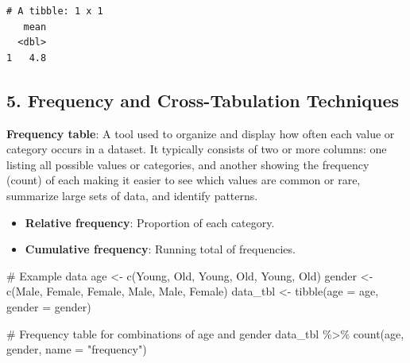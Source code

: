 \documentclass[
  man,
  floatsintext,
  longtable,
  nolmodern,
  notxfonts,
  notimes,
  colorlinks=true,linkcolor=blue,citecolor=blue,urlcolor=blue]{apa7}
\newenvironment{Shaded}{\begin{snugshade}}{\end{snugshade}}
\newcommand{\AttributeTok}[1]{\textcolor[rgb]{0.40,0.45,0.13}{#1}}
\newcommand{\CommentTok}[1]{\textcolor[rgb]{0.37,0.37,0.37}{#1}}
\newcommand{\FunctionTok}[1]{\textcolor[rgb]{0.28,0.35,0.67}{#1}}
\newcommand{\NormalTok}[1]{\textcolor[rgb]{0.00,0.23,0.31}{#1}}
\newcommand{\OtherTok}[1]{\textcolor[rgb]{0.00,0.23,0.31}{#1}}
\newcommand{\SpecialCharTok}[1]{\textcolor[rgb]{0.37,0.37,0.37}{#1}}
\newcommand{\StringTok}[1]{\textcolor[rgb]{0.13,0.47,0.30}{#1}}
\providecommand{\tightlist}{%
  \setlength{\itemsep}{0pt}\setlength{\parskip}{0pt}}
\begin{document}
\begin{verbatim}
# A tibble: 1 x 1
   mean
  <dbl>
1   4.8
\end{verbatim}

\subsection{5. Frequency and Cross-Tabulation
Techniques}\label{frequency-and-cross-tabulation-techniques}

\textbf{Frequency table}: A tool used to organize and display how often
each value or category occurs in a dataset. It typically consists of two
or more columns: one listing all possible values or categories, and
another showing the frequency (count) of each making it easier to see
which values are common or rare, summarize large sets of data, and
identify patterns.

\begin{itemize}
\tightlist
\item
  \textbf{Relative frequency}: Proportion of each category.
\item
  \textbf{Cumulative frequency}: Running total of frequencies.
\end{itemize}

\begin{Shaded}
\begin{Highlighting}[]
\CommentTok{\# Example data}
\NormalTok{age }\OtherTok{\textless{}{-}} \FunctionTok{c}\NormalTok{(}\StringTok{\textquotesingle{}Young\textquotesingle{}}\NormalTok{, }\StringTok{\textquotesingle{}Old\textquotesingle{}}\NormalTok{, }\StringTok{\textquotesingle{}Young\textquotesingle{}}\NormalTok{, }\StringTok{\textquotesingle{}Old\textquotesingle{}}\NormalTok{, }\StringTok{\textquotesingle{}Young\textquotesingle{}}\NormalTok{, }\StringTok{\textquotesingle{}Old\textquotesingle{}}\NormalTok{)}
\NormalTok{gender }\OtherTok{\textless{}{-}} \FunctionTok{c}\NormalTok{(}\StringTok{\textquotesingle{}Male\textquotesingle{}}\NormalTok{, }\StringTok{\textquotesingle{}Female\textquotesingle{}}\NormalTok{, }\StringTok{\textquotesingle{}Female\textquotesingle{}}\NormalTok{, }\StringTok{\textquotesingle{}Male\textquotesingle{}}\NormalTok{, }\StringTok{\textquotesingle{}Male\textquotesingle{}}\NormalTok{, }\StringTok{\textquotesingle{}Female\textquotesingle{}}\NormalTok{)}
\NormalTok{data\_tbl }\OtherTok{\textless{}{-}} \FunctionTok{tibble}\NormalTok{(}\AttributeTok{age =}\NormalTok{ age, }\AttributeTok{gender =}\NormalTok{ gender)}

\CommentTok{\# Frequency table for combinations of age and gender}
\NormalTok{data\_tbl }\SpecialCharTok{\%\textgreater{}\%}
  \FunctionTok{count}\NormalTok{(age, gender, }\AttributeTok{name =} \StringTok{"frequency"}\NormalTok{)}
\end{Highlighting}
\end{Shaded}
\end{document}
